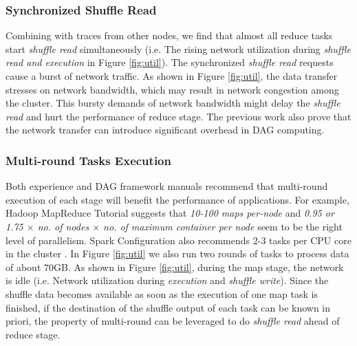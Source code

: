 \subsubsection{Synchronized Shuffle Read}
Combining with traces from other nodes, we find that almost all reduce tasks start \textit{shuffle read} simultaneously (i.e. The rising network utilization during \textit{shuffle read and execution} in Figure \ref{fig:util}). The synchronized \textit{shuffle read} requests cause a burst of network traffic. As shown in Figure \ref{fig:util}, the data transfer stresses on network bandwidth, which may result in network congestion among the cluster. This bursty demands of network bandwidth might delay the \textit{shuffle read} and hurt the performance of reduce stage. The previous work \cite{coflow, managing} also prove that the network transfer can introduce significant overhead in DAG computing.

\subsubsection{Multi-round Tasks Execution}\label{multi}
Both experience and DAG framework manuals recommend that multi-round execution of each stage will benefit the performance of applications.
For example, Hadoop MapReduce Tutorial  \cite{hadooptutorial} suggests that \textit{10-100 maps per-node} and \textit{0.95 or 1.75 $\times$ no. of nodes $\times$ no. of maximum container per node} seem to be the right level of parallelism. Spark Configuration also recommends 2-3 tasks per CPU core in the cluster \cite{sparkconf}.
In Figure \ref{fig:util} we also run two rounds of tasks to process data of about $70$GB. As shown in Figure \ref{fig:util}, during the map stage, the network is idle (i.e. Network utilization during \textit{execution} and \textit{shuffle write}). Since the shuffle data becomes available as soon as the execution of one map task is finished, if the destination of the shuffle output of each task can be known in priori, the property of multi-round can be leveraged to do \textit{shuffle read} ahead of reduce stage.


